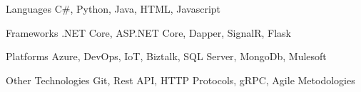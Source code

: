 

\begin{cvskills}
  \cvskill
    {Languages} %
    {C\#, Python, Java, HTML, Javascript} %

  \cvskill
    {Frameworks} %
    {.NET Core, ASP.NET Core, Dapper, SignalR, Flask} %
    
  \cvskill
    {Platforms}
    {Azure, DevOps, IoT, Biztalk, SQL Server, MongoDb, Mulesoft}
    
  \cvskill
    {Other Technologies}
    {Git, Rest API, HTTP Protocols, gRPC, Agile Metodologies}
\end{cvskills}
